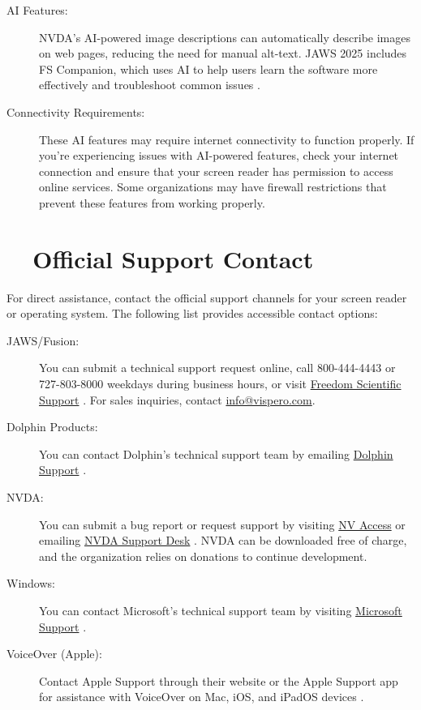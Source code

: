 \begin{description}
	\item[AI Features:] NVDA's AI-powered image descriptions can automatically describe images on web pages, reducing the need for manual alt-text. JAWS 2025 includes FS Companion, which uses AI to help users learn the software more effectively and troubleshoot common issues \cite{NarratorImageDescriptions, JAWSAILabeler}.
	\item[Connectivity Requirements:] These AI features may require internet connectivity to function properly. If you're experiencing issues with AI-powered features, check your internet connection and ensure that your screen reader has permission to access online services. Some organizations may have firewall restrictions that prevent these features from working properly.
\end{description}

\section{~~Official Support Contact}
\label{app1:report}
For direct assistance, contact the official support channels for your screen reader or operating system. The following list provides accessible contact options:

\begin{description}
	\item[JAWS/Fusion:] You can submit a technical support request online, call 800-444-4443 or 727-803-8000 weekdays during business hours, or visit \href{https://support.freedomscientific.com/support}{Freedom Scientific Support} \cite{FreedomScientificJAWS}. For sales inquiries, contact \href{mailto:info@vispero.com}{info@vispero.com}.
	\item[Dolphin Products:] You can contact Dolphin's technical support team by emailing \href{mailto:support@yourdolphin.com}{Dolphin Support} \cite{DolphinScreenreaderRequirements}.
	\item[NVDA:] You can submit a bug report or request support by visiting \href{https://www.nvaccess.org/}{NV Access} or emailing \href{mailto:info@nvaccess.org}{NVDA Support Desk} \cite{NVAccess}. NVDA can be downloaded free of charge, and the organization relies on donations to continue development.
	\item[Windows:] You can contact Microsoft's technical support team by visiting \href{https://support.microsoft.com/}{Microsoft Support} \cite{MicrosoftAccessibility, DisabilityAnswerDesk}.
	\item[VoiceOver (Apple):] Contact Apple Support through their website or the Apple Support app for assistance with VoiceOver on Mac, iOS, and iPadOS devices \cite{AppleAccessibility}.
\end{description}

